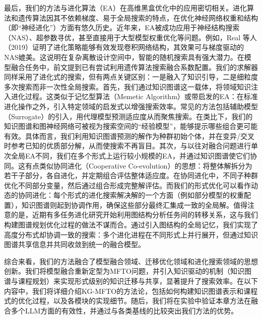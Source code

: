 \documentclass[../main.tex]{subfiles}
\begin{document}
最后，我们的方法与进化算法（EA）在高维黑盒优化中的应用密切相关。进化算法和遗传算法因其不依赖梯度、易于全局搜索的特点，在优化神经网络权重和结构（即“神经进化”）方面有悠久历史。近年来，EA被成功应用于神经结构搜索（NAS）、超参数寻优，甚至直接用于大型模型权重优化等问题。例如，Real 等人（2019）证明了进化策略能够有效发现卷积网络结构，其效果可与梯度驱动的NAS媲美。这说明在复杂离散设计空间中，智能的随机搜索具有强大潜力。在模型融合任务中，前文提到已有尝试利用遗传算法搜索融合系数配置。我们的求解器同样采用了进化式的搜索，但有两点关键区别：一是融入了知识引导，二是细粒度多次搜索而非一次性全局搜索。首先，我们通过知识图谱这一载体，将领域知识注入进化过程。这类似于记忆型算法（Memetic Algorithm）或带启发的EA：在标准进化操作之外，引入特定领域的启发式以增强搜索效率。常见的方法包括辅助模型（Surrogate）的引入，用代理模型预测适应度从而聚焦搜索。在类比下，我们的知识图谱和图神经网络可被视为搜索空间的“经验模型”，能够提示哪些组合更可能有效。具体而言，我们利用知识图谱预测的解作为种群初始个体，并在变异/交叉时参考已知的优质部分解，从而使搜索不再盲目。其次，与以往对融合问题进行单次全局EA不同，我们在多个形式上运行较小规模的EA，并通过知识图谱使它们协同。这有点类似协同进化（Cooperative Co-evolution）的思想：将整体解拆分为若干子部分，各自进化，并定期组合评估整体适应度。在协同进化中，不同子种群优化不同部分变量，然后通过组合形成完整解评估。而我们的形式优化可以看作动态的协同进化：每个形式的进化搜索解决解的一个方面（例如部分模型的权重配置），知识图谱则起到协调作用，确保这些部分最终汇集成一致的全局解。值得注意的是，近期有多任务进化研究开始利用图结构分析任务间的转移关系，这与我们构建图谱规划优化过程的做法不谋而合。通过引入图结构的全局记忆，我们实现了高度分布式却协调一致的搜索：多个进化进程在不同形式上并行展开，但通过知识图谱共享信息并共同收敛到统一的融合模型。

综合来看，我们的方法融合了模型融合领域、迁移优化领域和进化搜索领域的思想创新。我们将模型融合重新定型为MFTO问题，并引入知识驱动的机制（知识图谱与课程规划）来实现形式级别的知识迁移与共享，显著提升了搜索效率。在以下内容中，我们将详细介绍KG-MFTO的方法论，包括如何构建知识图谱表示和课程式的优化过程，以及各模块的实现细节。随后，我们将在实验中验证本章方法在融合多个LLM方面的有效性，并通过与各类基线的比较突出我们方法的优势。

\end{document}
